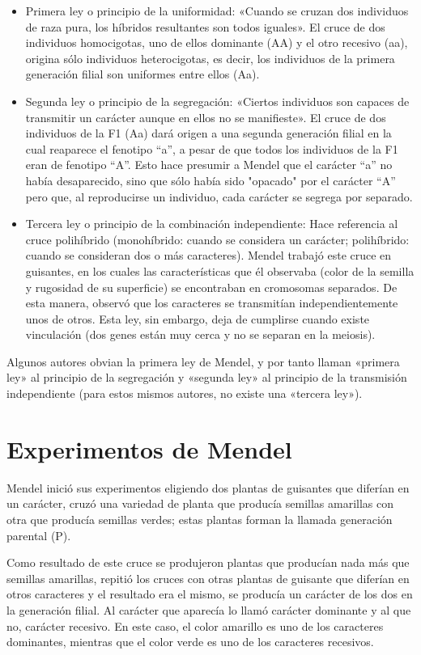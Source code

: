 \documentclass{report}
\begin{document}
\begin{itemize}
	\item Primera ley o principio de la uniformidad: «Cuando se cruzan dos individuos de raza pura, los híbridos resultantes son todos iguales». El cruce de dos individuos homocigotas, uno de ellos dominante (AA) y el otro recesivo (aa), origina sólo individuos heterocigotas, es decir, los individuos de la primera generación filial son uniformes entre ellos (Aa).

	\item Segunda ley o principio de la segregación: «Ciertos individuos son capaces de transmitir un carácter aunque en ellos no se manifieste». El cruce de dos individuos de la F1 (Aa) dará origen a una segunda generación filial en la cual reaparece el fenotipo ``a'', a pesar de que todos los individuos de la F1 eran de fenotipo ``A''. Esto hace presumir a Mendel que el carácter ``a'' no había desaparecido, sino que sólo había sido "opacado" por el carácter ``A'' pero que, al reproducirse un individuo, cada carácter se segrega por separado.
	\item Tercera ley o principio de la combinación independiente: Hace referencia al cruce polihíbrido (monohíbrido: cuando se considera un carácter; polihíbrido: cuando se consideran dos o más caracteres). Mendel trabajó este cruce en guisantes, en los cuales las características que él observaba (color de la semilla y rugosidad de su superficie) se encontraban en cromosomas separados. De esta manera, observó que los caracteres se transmitían independientemente unos de otros. Esta ley, sin embargo, deja de cumplirse cuando existe vinculación (dos genes están muy cerca y no se separan en la meiosis).
\end{itemize}

Algunos autores obvian la primera ley de Mendel, y por tanto llaman «pri\-me\-ra ley» al principio de la segregación y «segunda ley» al principio de la transmisión independiente (para estos mismos autores, no existe una «tercera ley»).

\chapter{Experimentos de Mendel}
Mendel inició sus experimentos eligiendo dos plantas de guisantes que diferían en un carácter, cruzó una variedad de planta que producía semillas amarillas con otra que producía semillas verdes; estas plantas forman la llamada generación parental (P).

Como resultado de este cruce se produjeron plantas que producían nada más que semillas amarillas, repitió los cruces con otras plantas de guisante que diferían en otros caracteres y el resultado era el mismo, se producía un carácter de los dos en la generación filial. Al carácter que aparecía lo llamó carácter dominante y al que no, carácter recesivo. En este caso, el color amarillo es uno de los caracteres dominantes, mientras que el color verde es uno de los caracteres recesivos.
\end{document}
